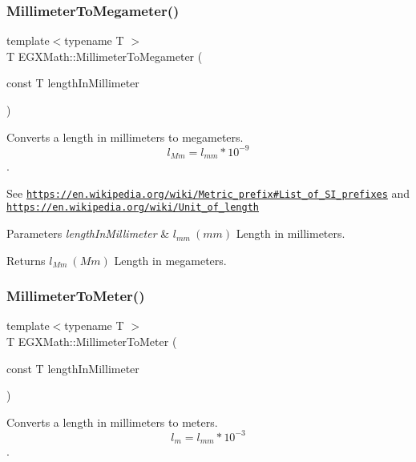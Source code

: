 \subsubsection{\texorpdfstring{Millimeter\+To\+Megameter()}{MillimeterToMegameter()}}
{\footnotesize\ttfamily template$<$typename T $>$ \\
T E\+G\+X\+Math\+::\+Millimeter\+To\+Megameter (\begin{DoxyParamCaption}\item[{const T}]{length\+In\+Millimeter }\end{DoxyParamCaption})}



Converts a length in millimeters to megameters. \[ l_{Mm}=l_{mm} * 10^{-9} \]. 

See \href{https://en.wikipedia.org/wiki/Metric_prefix#List_of_SI_prefixes}{\tt https\+://en.\+wikipedia.\+org/wiki/\+Metric\+\_\+prefix\#\+List\+\_\+of\+\_\+\+S\+I\+\_\+prefixes} and \href{https://en.wikipedia.org/wiki/Unit_of_length}{\tt https\+://en.\+wikipedia.\+org/wiki/\+Unit\+\_\+of\+\_\+length} 
\begin{DoxyParams}{Parameters}
{\em length\+In\+Millimeter} & $ l_{mm}\ (mm)$ Length in millimeters. \\
\hline
\end{DoxyParams}
\begin{DoxyReturn}{Returns}
$ l_{Mm}\ (Mm)$ Length in megameters. 
\end{DoxyReturn}
\mbox{\label{group___e_g_x_math-_conversions-_length_conversions-_millimeter-_s_i_ga5bf52177bcfa3cce836b7cec4dcf5fb5}} 
\subsubsection{\texorpdfstring{Millimeter\+To\+Meter()}{MillimeterToMeter()}}
{\footnotesize\ttfamily template$<$typename T $>$ \\
T E\+G\+X\+Math\+::\+Millimeter\+To\+Meter (\begin{DoxyParamCaption}\item[{const T}]{length\+In\+Millimeter }\end{DoxyParamCaption})}



Converts a length in millimeters to meters. \[ l_{m}=l_{mm} * 10^{-3} \]. 


